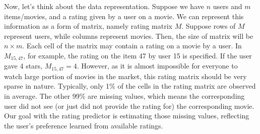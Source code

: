 \documentclass[12pt]{article}
\begin{document}
Now, let's think about the data representation. Suppose we have $n$
users and $m$ items/movies, and a rating given by a user on a movie. 
We can represent this information as a form of matrix, namely 
rating matrix $M$. Suppose rows of $M$ represent users, while columns represent  movies.
Then, the size of matrix will be $n \times m$. Each cell of the
matrix may contain a rating on a movie by a user. In $M_{15,47}$,
for example, the rating on the item 47 by user 15 is specified. If the user gave 4 stars, $M_{15,47} = 4$. However, as it is almost
impossible for everyone to watch large portion of movies in the
market, this rating matrix should be very sparse in nature.
Typically, only 1\% of the cells in the rating matrix are observed
in average. The other 99\% are missing values, which means the
corresponding user did not see (or just did not provide the rating
for) the corresponding movie. Our goal with the rating predictor is
estimating those missing values, reflecting the user's preference
learned from available ratings.
\end{document}
